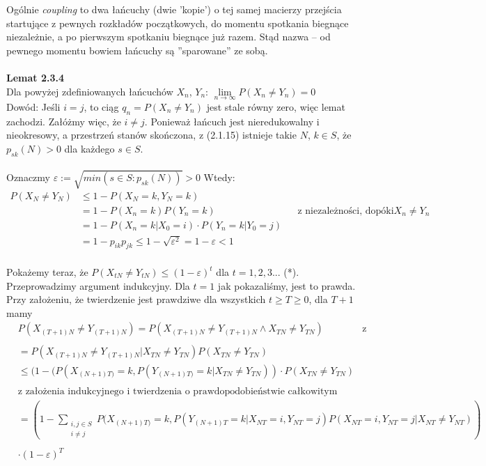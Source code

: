 \documentclass[a4paper]{article}
\begin{document}
Ogólnie \textit{coupling} to dwa łańcuchy (dwie 'kopie') o tej samej macierzy przejścia startujące z pewnych rozkładów początkowych, do momentu spotkania biegnące niezależnie, a po pierwszym spotkaniu biegnące już razem. Stąd nazwa – od pewnego momentu bowiem łańcuchy są ''sparowane'' ze sobą.
\\
\\
\textbf{Lemat 2.3.4}\\
Dla powyżej zdefiniowanych łańcuchów $X_n$, $Y_n$: $\lim\limits_{n \to \infty} P(X_n \neq Y_n) = 0$\\
Dowód: Jeśli $i = j$, to ciąg $q_n = P(X_n \neq Y_n)$ jest stale równy zero, więc lemat zachodzi. Załóżmy więc, że $i \neq j$. Ponieważ łańcuch jest nieredukowalny i nieokresowy, a przestrzeń stanów skończona, z (2.1.15) istnieje takie $N$, $k \in S$, że $p_{sk}(N) > 0$ dla każdego $s \in S$.\\\\
Oznaczmy $\varepsilon := \sqrt{min(s \in S: p_{sk}(N))} > 0$ Wtedy:
\begin{align*}
P(X_N \neq Y_N) &\leq 1 - P(X_N = k, Y_N = k) \\
&= 1 - P(X_n = k)P(Y_n = k) && \text{z niezależności, dopóki $X_n \neq Y_n$} \\
&= 1 - P(X_n = k|X_0 = i) \cdot P(Y_n = k|Y_0 = j) \\
&= 1 - p_{ik}p_{jk} \leq 1 - \sqrt{\varepsilon^2} = 1 - \varepsilon < 1
\end{align*}
\\
Pokażemy teraz, że $P(X_{tN} \neq Y_{tN}) \leq (1-\varepsilon)^t$ dla $t=1,2,3...$ (*). Przeprowadzimy argument indukcyjny. Dla $t = 1$ jak pokazaliśmy, jest to prawda. Przy założeniu, że twierdzenie jest prawdziwe dla wszystkich $t \geq T \geq 0$, dla $T+1$ mamy
\begin{align*}
    &P(X_{(T+1)N} \neq Y_{(T+1)N}) = P(X_{(T+1)N} \neq Y_{(T+1)N} \land X_{TN} \neq Y_{TN})
    &\text{z konstrukcji łańcuchów:}\\\\
    &= P(X_{(T+1)N} \neq Y_{(T+1)N} | X_{TN} \neq Y_{TN})P(X_{TN} \neq Y_{TN})\\
    &\leq (1 - (P(X_{(N+1)T)} = k, P(Y_{(N+1)T)} = k  |  X_{TN} \neq Y_{TN})) \cdot P(X_{TN} \neq Y_{TN}) \\\\
    &\text{z  założenia indukcyjnego i twierdzenia o prawdopodobieństwie całkowitym}
    \end{align*}
    \begin{align*}
    & = \left(1 - \sum\limits_{\substack{i,j \in S\\i\neq j}} P(X_{(N+1)T)} = k, P(Y_{(N+1)T} = k | X_{NT} = i, Y_{NT} = j)P(X_{NT} = i, Y_{NT} = j | X_{NT} \neq Y_{NT})\right)\\\\
    &\cdot (1 - \varepsilon)^T
    \end{align*}
\end{document}
